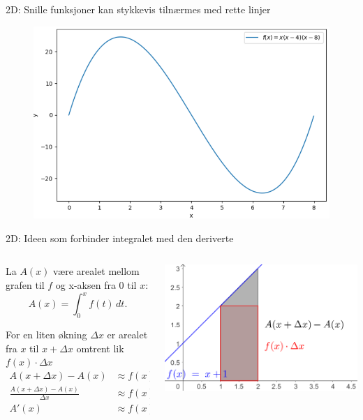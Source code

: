 \blueheader
\begin{frame}{2D: Snille funksjoner kan stykkevis tilnærmes med rette linjer}
\begin{figure}
    \centering
    \includegraphics[width=0.8\linewidth]{R2-K2A-3.png}
\end{figure}
\end{frame}

\blueheader
\begin{frame}{2D: Ideen som forbinder integralet med den deriverte}
\begin{columns}[onlytextwidth]
  \begin{column}{0.45\textwidth}
    La \(A(x)\) være arealet mellom grafen til \(f\)  og x-aksen fra \(0\) til \(x\):
    \[
    A(x)=\int_{0}^{x} f(t)\,dt.
    \]

    For en liten økning \(\Delta x\) er arealet fra \(x\) til \(x+\Delta x\) omtrent lik $ f(x)\cdot\Delta x$
    \begin{align*}
      A(x+\Delta x)-A(x) &\approx f(x)\,\Delta x\\[0.8em]
      \frac{A(x+\Delta x)-A(x)}{\Delta x} &\approx f(x)\\[0.8em]
      A'(x) &\approx f(x)
    \end{align*}
  \end{column}
  \begin{column}{0.55\textwidth}
    \centering
    \includegraphics[width=\linewidth]{R2-K2A-4.png}
  \end{column}
\end{columns}
\end{frame}

